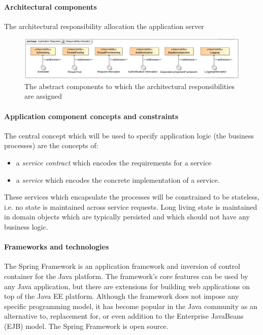 \documentclass[a4paper,12pt]{report}
\begin{document}
			\paragraph {Architectural components}
			\hfill \break
				The architectural responsibility allocation the application server			
				\begin{figure}[htb]
					\centering
					\includegraphics [scale=0.5]{../Diagrams/applicationServerResponsibiltiesAllocationZ.png}
					\caption{The abstract components to which the architectural responsibilities are assigned}
				\end{figure}
			\newpage
			\paragraph {Application component concepts and constraints}
			The central concept which will be used to specify application logic (the business processes) are the
			concepts of:
				\begin {itemize}
					\item a \textit{service contract} which encodes the requirements for a service
					\item a \textit{service} which encodes the concrete implementation of a service. 
				\end {itemize}
			These services which encapsulate the processes will be constrained to be stateless, i.e. no state
			is maintained across service requests.
			Long living state is maintained in domain objects which are typically persisted and which should
			not have any business logic.
			
			\paragraph {Frameworks and technologies}
			\hfill \break
			The Spring Framework is an application framework and inversion of control container for the Java platform. The framework's core features can be used by any Java application, but there are extensions for building web applications on top of the Java EE platform. Although the framework does not impose any specific programming model, it has become popular in the Java community as an alternative to, replacement for, or even addition to the Enterprise JavaBeans (EJB) model. The Spring Framework is open source.
			
\end{document}
